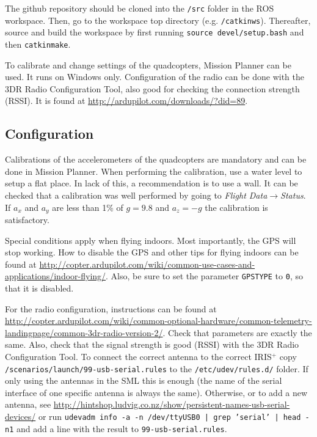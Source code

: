 \documentclass[titlepage,11pt,a4paper]{article}
\begin{document}
The github repository should be cloned into the \texttt{/src} folder
in the ROS workspace. Then, go to the workspace top directory (e.g.
\texttt{/catkin\textunderscore ws}). Thereafter, source and build the
workspace by first running \texttt{source devel/setup.bash} and then
\texttt{catkin\textunderscore make}.

To calibrate and change settings of the quadcopters, Mission Planner
can be used. It runs on Windows only. Configuration of the radio can
be done with the 3DR Radio Configuration Tool, also good for checking
the connection strength (RSSI). It is found at
\url{http://ardupilot.com/downloads/?did=89}.


\subsection{Configuration}
\label{subsec:configuration}
Calibrations of the accelerometers of the quadcopters are mandatory
and can be done in Mission Planner. When performing the calibration,
use a water level to setup a flat place. In lack of this, a
recommendation is to use a wall. It can be checked that a calibration
was well performed by going to \textit{Flight
  Data}$\rightarrow$\textit{Status}. If $a_x$ and $a_y$ are less than
1\% of $g = 9.8$ and $a_z = -g$ the calibration is satisfactory.

Special conditions apply when flying indoors. Most importantly, the
GPS will stop working. How to disable the GPS and other tips for
flying indoors can be found at \url{http://copter.ardupilot.com/wiki/common-use-cases-and-applications/indoor-flying/}. Also, be sure to set the parameter \texttt{GPS\textunderscore TYPE} to \texttt{0}, so that it is disabled. 

For the radio configuration, instructions can be found at
\url{http://copter.ardupilot.com/wiki/common-optional-hardware/common-telemetry-landingpage/common-3dr-radio-version-2/}. Check
that parameters are exactly the same. Also, check that the signal
strength is good (RSSI) with the 3DR Radio Configuration Tool. To
connect the correct antenna to the correct IRIS$^+$ copy
\texttt{/scenarios/launch/99-usb-serial.rules} to the
\texttt{/etc/udev/rules.d/} folder. If only using the antennas in the
SML this is enough (the name of the serial interface of one specific antenna is always
the same). Otherwise, or to add a new antenna, see
\url{http://hintshop.ludvig.co.nz/show/persistent-names-usb-serial-devices/}
or run \texttt{udevadm info -a -n /dev/ttyUSB0 | grep '{serial}' |
  head -n1} and add a line with the result to
\texttt{99-usb-serial.rules}.
\end{document}
